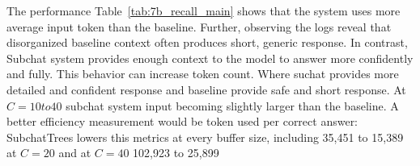 \documentclass[pdflatex,sn-mathphys-num]{sn-jnl}%
\theoremstyle{thmstyleone}%
\theoremstyle{thmstyletwo}%
\theoremstyle{thmstylethree}%
\begin{document}




The performance Table~\ref{tab:7b_recall_main} shows that the system uses more average input token than the baseline. Further, observing the logs reveal that disorganized baseline context often produces short, generic response. In contrast, Subchat system provides enough context to the model to answer more confidently and fully. This behavior can increase token count. Where suchat provides more detailed and confident response and baseline provide safe and short response. At $C=10 to 40$ subchat system input becoming slightly larger than the baseline. A better efficiency measurement would be token used per correct answer: SubchatTrees lowers this metrics at every buffer size, including 35,451 to 15,389 at $C=20$ and at $C=40$ 102,923 to 25,899
\end{document}
